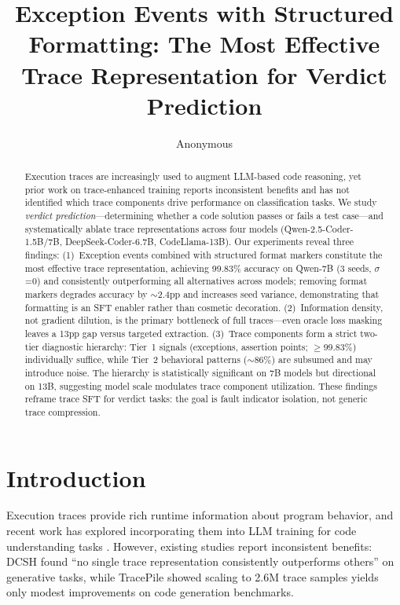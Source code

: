 \documentclass[11pt]{article}
\title{Exception Events with Structured Formatting: The Most Effective Trace Representation for Verdict Prediction}
\author{Anonymous}
\date{}
\begin{document}
\maketitle

\begin{abstract}
Execution traces are increasingly used to augment LLM-based code reasoning, yet prior work on trace-enhanced training reports inconsistent benefits and has not identified which trace components drive performance on classification tasks. We study \emph{verdict prediction}---determining whether a code solution passes or fails a test case---and systematically ablate trace representations across four models (Qwen-2.5-Coder-1.5B/7B, DeepSeek-Coder-6.7B, CodeLlama-13B). Our experiments reveal three findings: (1)~Exception events combined with structured format markers constitute the most effective trace representation, achieving 99.83\% accuracy on Qwen-7B (3 seeds, $\sigma$=0) and consistently outperforming all alternatives across models; removing format markers degrades accuracy by $\sim$2.4pp and increases seed variance, demonstrating that formatting is an SFT enabler rather than cosmetic decoration. (2)~Information density, not gradient dilution, is the primary bottleneck of full traces---even oracle loss masking leaves a 13pp gap versus targeted extraction. (3)~Trace components form a strict two-tier diagnostic hierarchy: Tier~1 signals (exceptions, assertion points; $\geq$99.83\%) individually suffice, while Tier~2 behavioral patterns ($\sim$86\%) are subsumed and may introduce noise. The hierarchy is statistically significant on 7B models but directional on 13B, suggesting model scale modulates trace component utilization. These findings reframe trace SFT for verdict tasks: the goal is fault indicator isolation, not generic trace compression.
\end{abstract}

\section{Introduction}

Execution traces provide rich runtime information about program behavior, and recent work has explored incorporating them into LLM training for code understanding tasks \citep{ni2024traced,shi2024dcsh,wang2024tracepile}. However, existing studies report inconsistent benefits: DCSH found ``no single trace representation consistently outperforms others'' on generative tasks, while TracePile showed scaling to 2.6M trace samples yields only modest improvements on code generation benchmarks.
\end{document}

